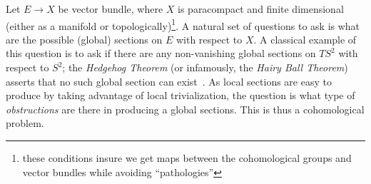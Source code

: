 \documentclass{book}
\begin{document}
Let $E \to X$ be vector bundle, where $X$ is paracompact and finite dimensional (either as a manifold or
topologically)\footnote{these conditions insure we get maps between the cohomological groups and vector
bundles while avoiding ``pathologies''}. A natural set of questions to ask is what are the possible (global)
sections on $E$ with respect to $X$. A classical example of this question is to ask if there are any
non-vanishing global sections on $TS^2$ with respect to $S^2$; the \emph{Hedgehog Theorem} (or infamously, the
\emph{Hairy Ball Theorem}) asserts that no such global section can exist~\cite{NateAlgTop}. As local sections
are easy to produce by taking advantage of local trivialization, the question is what type of
\emph{obstructions} are there in producing a global sections. This is thus a cohomological problem.

\end{document}
